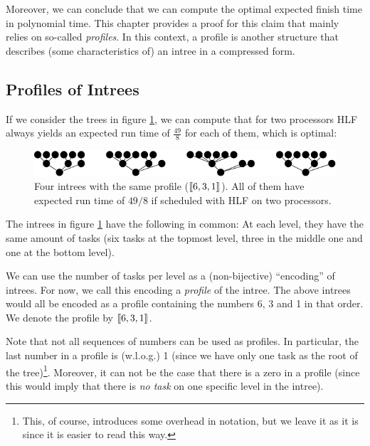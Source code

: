 Moreover, we can conclude that we can compute the optimal expected finish time in polynomial time. This chapter provides a proof for this claim that mainly relies on so-called \emph{profiles}. In this context, a profile is another structure that describes (some characteristics of) an intree in a compressed form.

\subsection{Profiles of Intrees}
\label{sec:p2-simple-method-runtime-profiles-for-intrees}

If we consider the trees in figure \ref{fig:p2-four-intrees-with-same-profile-6-3-1}, we can compute that for two processors HLF always yields an expected run time of $\frac{49}{8}$ for each of them, which is optimal:

\begin{figure}[ht]
  \centering
  \includegraphics{p2/four_profiles_631.pdf}  
  \caption{Four intrees with the same profile ($\left\llbracket 6,3,1 \right\rrbracket$). All of them have expected run time of $49/8$ if scheduled with HLF on two processors.}
  \label{fig:p2-four-intrees-with-same-profile-6-3-1}
\end{figure}

The intrees in figure \ref{fig:p2-four-intrees-with-same-profile-6-3-1} have the following in common: At each level, they have the same amount of tasks (six tasks at the topmost level, three in the middle one and one at the bottom level).

We can use the number of tasks per level as a (non-bijective) ``encoding'' of intrees. For now, we call this encoding a \emph{profile} of the intree. The above intrees would all be encoded as a profile containing the numbers 6, 3 and 1 in that order. We denote the profile by $\left\llbracket 6, 3, 1 \right\rrbracket$.

Note that not all sequences of numbers can be used as profiles. In particular, the last number in a profile is (w.l.o.g.) 1 (since we have only one task as the root of the tree)\footnote{This, of course, introduces some overhead in notation, but we leave it as it is since it is easier to read this way.}. Moreover, it can not be the case that there is a zero in a profile (since this would imply that there is \emph{no task} on one specific level in the intree).

